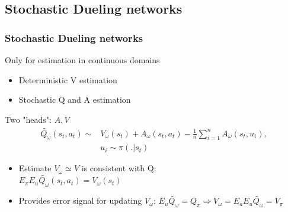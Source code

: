 \documentclass{beamer}
\begin{document}
\subsection{Stochastic Dueling networks}
\begin{frame}
\frametitle{Stochastic Dueling networks}
Only for estimation in continuous domains
\begin{itemize}
\item Deterministic V estimation
\item Stochastic Q and A estimation
\end{itemize}

\vspace{3mm}
Two "heads": $A, V$
\begin{align*}
\tilde{Q_\omega} (s_t, a_t) \sim & V_\omega (s_t) + A_\omega(s_t, a_t) - \frac{1}{n} \sum_{i=1}^n A_\omega (s_t, u_i),\\ & u_i \sim \pi(.|s_t)
\end{align*}

\begin{itemize}
\item Estimate $V_\omega \simeq V$ is consistent with Q: \\
$E_\pi E_u \tilde{Q_\omega} (s_t, a_t) = V_\omega (s_t)$\\
\item Provides error signal for updating $V_\omega$: $E_u \tilde{Q_\omega} = Q_\pi \Rightarrow V_\omega = E_a E_u \tilde{Q_\omega} = V_\pi$
\end{itemize}

\end{frame}
\end{document}
